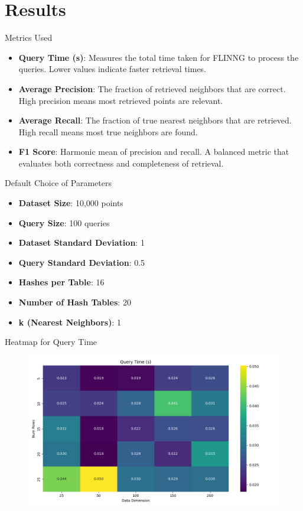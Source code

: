 \documentclass[Serif, 10pt, brown]{beamer}
\theoremstyle{example}
\theoremstyle{plain}
\begin{document}
\section{Results}
\begin{frame}{Metrics Used}
    \begin{itemize}
        \item \textbf{Query Time (s)}: Measures the total time taken for FLINNG to process the queries. Lower values indicate faster retrieval times.
        \item \textbf{Average Precision}: The fraction of retrieved neighbors that are correct. High precision means most retrieved points are relevant.
        \item \textbf{Average Recall}: The fraction of true nearest neighbors that are retrieved. High recall means most true neighbors are found.
        \item \textbf{F1 Score}: Harmonic mean of precision and recall. A balanced metric that evaluates both correctness and completeness of retrieval.
    \end{itemize}
\end{frame}


\begin{frame}{Default Choice of Parameters}
    \begin{itemize}
        \item \textbf{Dataset Size}: 10,000 points
        \item \textbf{Query Size}: 100 queries
        \item \textbf{Dataset Standard Deviation}: 1
        \item \textbf{Query Standard Deviation}: 0.5
        \item \textbf{Hashes per Table}: 16
        \item \textbf{Number of Hash Tables}: 20
        \item \textbf{k (Nearest Neighbors)}: 1
    \end{itemize}
\end{frame}


\begin{frame}{Heatmap for Query Time}
	\begin{figure}
        \centering
        \includegraphics[width=1\linewidth]{../images/query_time_heatmap.png}
    \end{figure}
\end{frame}
\end{document}

